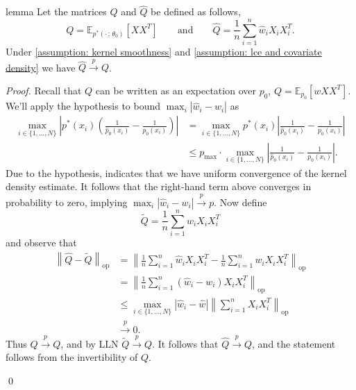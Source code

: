 \documentclass[11pt]{article}
\begin{document}
\begin{restatable}{lemma}{}
    Let the matrices $Q$ and $\hat{Q}$ be defined as follows, 
    \begin{equation}
    Q = \mathbb{E}_{p^*(\cdot\,;\, \theta_0)}\left[XX^T\right] \qquad \text{and} \qquad \hat{Q} = \frac{1}{n}\sum_{i = 1}^n\hat{w}_iX_iX_i^T.
    \end{equation}
    Under \cref{assumption: kernel smoothness} and \cref{assumption: lce and covariate density} we have $\hat{Q}\overset{p}{\rightarrow}Q$. \label{lemma: Q convergence}
\end{restatable}
\noindent \textit{Proof.} Recall that $Q$ can be written as an expectation over $p_0$, $Q = \mathbb{E}_{p_0}\left[wXX^T\right]$. We'll apply the hypothesis to bound $\max_i|\hat{w}_i - w_i|$ as
\begin{align*}
    \max_{i \in \{1, \dots, N\}} \left|p^*(x_i)\left(\frac{1}{\hat{p}_0(x_i)} - \frac{1}{p_0(x_i)}\right)\right| & =  \max_{i \in \{1, \dots, N\}} p^*(x_i)\left|\frac{1}{\hat{p}_0(x_i)} - \frac{1}{p_0(x_i)}\right| \\
    &\leq p_{\max}\cdot \max_{i \in \{1, \dots, N\}}\left|\frac{1}{\hat{p}_0(x_i)} - \frac{1}{p_0(x_i)}\right|.
\end{align*}
Due to the hypothesis,  indicates that we have uniform convergence of the kernel density estimate. It follows that the right-hand term above converges in probability to zero, implying $\max_i|\hat{w}_i - w_i|\overset{p}{\rightarrow}p$. Now define 
\[\tilde{Q} = \frac{1}{n}\sum_{i = 1}^n w_iX_iX_i^T\]
and observe that 
\begin{align}
\left\|\hat{Q} - \tilde{Q}\right\|_{\text{op}} &= \left\|\frac{1}{n}\sum_{i = 1}^n\hat{w}_iX_iX_i^T - \frac{1}{n}\sum_{i = 1}^nw_iX_iX_i^T\right\|_{\text{op}} \\
&= \left\|\frac{1}{n}\sum_{i = 1}^n(\hat{w}_i - w_i)X_iX_i^T\right\|_{\text{op}} \\
&\leq \max_{i \in \{1, \dots, N\}}|\hat{w}_i - \hat{w}| \left\|\sum_{i = 1}^nX_iX_i^T\right\|_{\text{op}} \\
&\overset{p}{\rightarrow} 0.
\end{align}
Thus $\hat{Q}\overset{p}{\rightarrow}Q$, and by LLN $\tilde{Q} \overset{p}{\rightarrow}Q$. It follows that $\hat{Q} \overset{p}{\rightarrow}Q$, and the statement follows from the invertibility of $Q$.

\qed{}
\end{document}
